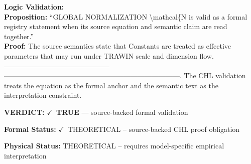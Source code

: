 \textbf{Logic Validation:}\\
\textbf{Proposition:} ``GLOBAL NORMALIZATION \textbackslash{}mathcal\{N is valid as a formal registry statement when its source
equation and semantic claim are read together.''\\
\textbf{Proof:} The source semantics state that Constants are treated as effective parameters that may
run under TRAWIN scale and dimension flow. ---------------------------------------------
---------------------------------------------------------------------------. The CHL
validation treats the equation as the formal anchor and the semantic text as the
interpretation constraint.

\textbf{VERDICT:} \ensuremath{\checkmark}\ \textbf{TRUE} --- source-backed formal validation

\textbf{Formal Status:} \ensuremath{\checkmark}\ THEORETICAL -- source-backed CHL proof obligation

\textbf{Physical Status:} THEORETICAL -- requires model-specific empirical interpretation
\par\vspace{0.45em}
\par
\ifTZPDarkEdition
{}
\fi
\endgroup
\endgroup
